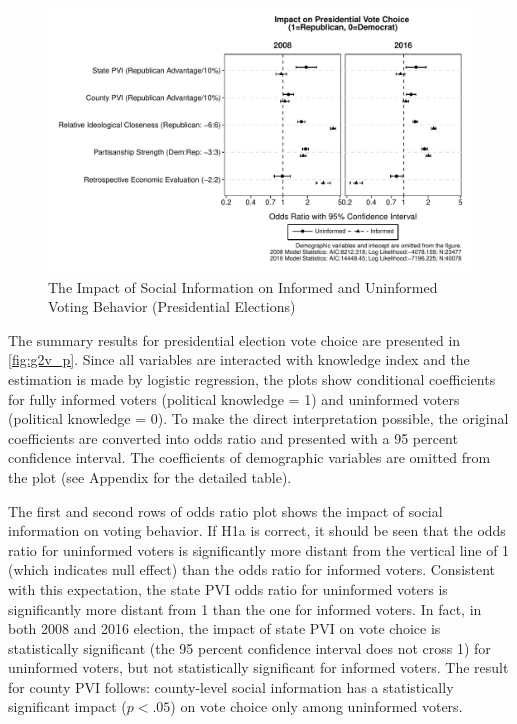\documentclass[doc,natbib,12pt]{apa6}\usepackage[]{graphicx}\usepackage[]{color}
\makeatletter
\def\maxwidth{ %
  \ifdim\Gin@nat@width>\linewidth
    \linewidth
  \else
    \Gin@nat@width
  \fi
}
\newenvironment{knitrout}{}{} %
\makeatother
\begin{document}
\begin{knitrout}
\color{fgcolor}\begin{figure}[t!!!]

{\centering \includegraphics[width=\maxwidth]{figure/g2v_p-1} 

}

\caption[The Impact of Social Information on Informed and Uninformed Voting Behavior (Presidential Elections)]{The Impact of Social Information on Informed and Uninformed Voting Behavior (Presidential Elections)}\label{fig:g2v_p}
\end{figure}


\end{knitrout}
              
    \par The summary results for presidential election vote choice are presented in \autoref{fig:g2v_p}. Since all variables are interacted with knowledge index and the estimation is made by logistic regression, the plots show conditional coefficients for fully informed voters (political knowledge = 1) and uninformed voters (political knowledge = 0). To make the direct interpretation possible, the original coefficients are converted into odds ratio and presented with a 95 percent confidence interval. The coefficients of demographic variables are omitted from the plot (see Appendix for the detailed table). 
    
    \par The first and second rows of odds ratio plot shows the impact of social information on voting behavior. If H1a is correct, it should be seen that the odds ratio for uninformed voters is significantly more distant from the vertical line of 1 (which indicates null effect) than the odds ratio for informed voters. Consistent with this expectation, the state PVI odds ratio for uninformed voters is significantly more distant from 1 than the one for informed voters. In fact, in both 2008 and 2016 election, the impact of state PVI on vote choice is statistically significant (the 95 percent confidence interval does not cross 1) for uninformed voters, but not statistically significant for informed voters. The result for county PVI follows: county-level social information has a statistically significant impact ($p<.05$) on vote choice only among uninformed voters. 
    
\end{document}
